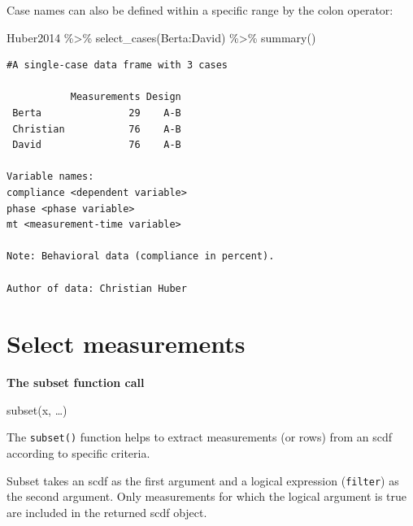 \documentclass[
  letterpaper,
  DIV=11,
  numbers=noendperiod]{scrreprt}
\newenvironment{Shaded}{\begin{snugshade}}{\end{snugshade}}
\newcommand{\FunctionTok}[1]{\textcolor[rgb]{0.28,0.35,0.67}{#1}}
\newcommand{\NormalTok}[1]{\textcolor[rgb]{0.00,0.23,0.31}{#1}}
\newcommand{\SpecialCharTok}[1]{\textcolor[rgb]{0.37,0.37,0.37}{#1}}
\begin{document}
Case names can also be defined within a specific range by the colon
operator:

\begin{Shaded}
\begin{Highlighting}[]
\NormalTok{Huber2014 }\SpecialCharTok{\%\textgreater{}\%}
  \FunctionTok{select\_cases}\NormalTok{(Berta}\SpecialCharTok{:}\NormalTok{David) }\SpecialCharTok{\%\textgreater{}\%}
  \FunctionTok{summary}\NormalTok{()}
\end{Highlighting}
\end{Shaded}

\begin{verbatim}
#A single-case data frame with 3 cases

           Measurements Design
 Berta               29    A-B
 Christian           76    A-B
 David               76    A-B

Variable names:
compliance <dependent variable>
phase <phase variable>
mt <measurement-time variable>

Note: Behavioral data (compliance in percent). 

Author of data: Christian Huber 
\end{verbatim}

\hypertarget{sec-subset}{%
\section{Select measurements}\label{sec-subset}}

\begin{tcolorbox}[enhanced jigsaw, breakable, rightrule=.15mm, bottomrule=.15mm, arc=.35mm, colback=white, colframe=quarto-callout-tip-color-frame, opacityback=0, leftrule=.75mm, toprule=.15mm, left=2mm]
\begin{minipage}[t]{5.5mm}
\textcolor{quarto-callout-tip-color}{\faLightbulb}
\end{minipage}%
\begin{minipage}[t]{\textwidth - 5.5mm}

\textbf{The subset function call}\vspace{2mm}

subset(x, \ldots)

\end{minipage}%
\end{tcolorbox}

The \texttt{subset()} function helps to extract measurements (or rows)
from an scdf according to specific criteria.

Subset takes an scdf as the first argument and a logical expression
(\texttt{filter}) as the second argument. Only measurements for which
the logical argument is true are included in the returned scdf object.
\end{document}
